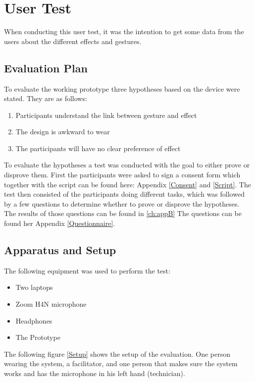 \section{User Test}
When conducting this user test, it was the intention to get some data from the users about the different effects and gestures. 

\subsection{Evaluation Plan}
To evaluate the working prototype three hypotheses based on the device were stated. They are as follows:

\begin{enumerate}
\item Participants understand the link between gesture and effect
\item The design is awkward to wear
\item The participants will have no clear preference of effect
\end{enumerate} 

To evaluate the hypotheses a test was conducted with the goal to either prove or disprove them. First the participants were asked to sign a consent form which together with the script can be found here: Appendix \ref{Consent} and \ref{Script}. The test then consisted of the participants doing different tasks, which was followed by a few questions to determine whether to prove or disprove the hypotheses. The results of those questions can be found in \ref{ch:appB} The questions can be found her Appendix \ref{Questionnaire}. 

\subsection{Apparatus and Setup}

The following equipment was used to perform the test:
\begin{itemize}
 \item Two laptops
 \item Zoom H4N microphone 
 \item Headphones
 \item The Prototype
\end{itemize}

The following figure \ref{Setup} shows the setup of the evaluation. One person wearing the system, a facilitator, and one person that makes sure the system works and has the microphone in 
his left hand (technician).

